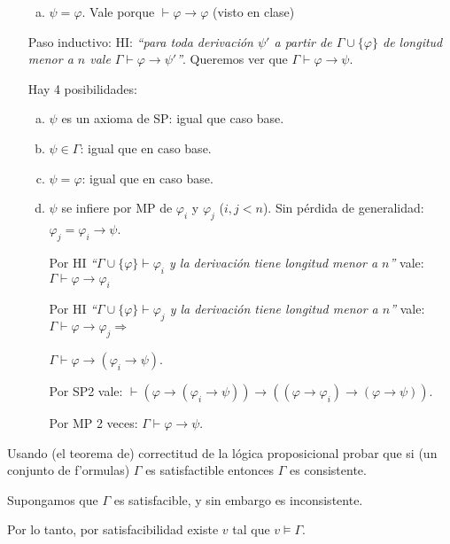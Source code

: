 \begin{questions}
\begin{solution}
\begin{itemize}[\quad]
\begin{enumerate}[a)]
   \item $\psi=\varphi$. 
    Vale porque $\vdash\varphi\rightarrow\varphi$ (visto en clase)
  \end{enumerate}

  \item[Paso inductivo:] HI: {\it ``para toda derivaci\'on $\psi'$ a partir de $\Gamma\cup\{\varphi\}$ de longitud menor a $n$ vale $\Gamma\vdash\varphi\rightarrow\psi'$''}. Queremos ver que $\Gamma\vdash\varphi\rightarrow\psi$. 
  
  Hay 4 posibilidades: 
  \begin{enumerate}[a)]
   \item $\psi$ es un axioma de SP: igual que caso base. 
   \item $\psi\in\Gamma$: igual que en caso base. 
   \item $\psi=\varphi$: igual que en caso base. 
   \item $\psi$ se infiere por MP de $\varphi_i$ y $\varphi_j$ ($i,j<n$). Sin p\'erdida de generalidad: $\varphi_j=\varphi_i\rightarrow\psi$. 
   
    Por HI {\it ``$\Gamma\cup\{\varphi\}\vdash\varphi_i$ y la derivaci\'on tiene longitud menor a $n$''} vale: $\Gamma\vdash\varphi\rightarrow\varphi_i$
    
    Por HI {\it ``$\Gamma\cup\{\varphi\}\vdash\varphi_j$ y la derivaci\'on tiene longitud menor a $n$''} vale: $\Gamma\vdash\varphi\rightarrow\varphi_j\Rightarrow$
    
    \hfill $\Gamma\vdash\varphi\rightarrow(\varphi_i\rightarrow\psi)$.
    
    Por SP2 vale: $\vdash (\varphi\rightarrow(\varphi_i\rightarrow\psi))\rightarrow((\varphi\rightarrow\varphi_i)\rightarrow(\varphi\rightarrow\psi))$.
    
    Por MP 2 veces: $\Gamma\vdash\varphi\rightarrow\psi$.
  \end{enumerate}

 \end{itemize}

\end{solution}

\question Usando (el teorema de) correctitud de la lógica proposicional probar que si (un conjunto de f'ormulas) $\Gamma$ es satisfactible entonces $\Gamma$ es consistente. 
\begin{solution}

Supongamos que $\Gamma$ es satisfacible, y sin embargo es inconsistente. 

Por lo tanto, por satisfacibilidad existe $v$ tal que $v\vDash\Gamma$.


\end{solution}
\end{questions}

